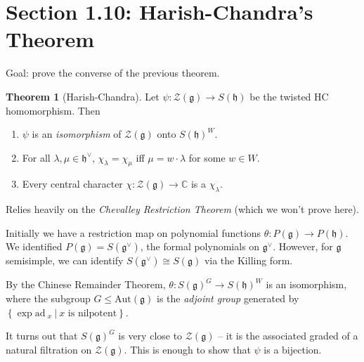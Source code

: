 \documentclass[11pt]{scrartcl}
\theoremstyle{definition}
\theoremstyle{theorem}
\newtheorem{theorem}{Theorem}[section]
\theoremstyle{proof}
\newenvironment{proof}
{\pushQED{$\qed$}\pf}
{\par\popQED\endpf}
\theoremstyle{definition}
\theoremstyle{break}
\theoremstyle{problem}
\newcommand{\CC}[0]{{\mathbb{C}}}
\newcommand{\ad}[0]{\mathrm{ad}~}
\newcommand{\aut}[0]{\mathrm{Aut}}
\newcommand{\dual}[0]{^\vee}
\newcommand{\lieg}[0]{{\mathfrak{g}}}
\newcommand{\lieh}[0]{{\mathfrak{h}}}
\newcommand{\mcz}[0]{{\mathcal{Z}}}
\newcommand{\suchthat}[0]{{~\mathrel{\Big|}~}}
\newcommand{\theset}[1]{\left\{{#1}\right\}}
\renewcommand{\qed}[0]{\hfill\blacksquare}
\renewcommand{\to}[0]{\longrightarrow}
\begin{document}
\hypertarget{section-1.10-harish-chandras-theorem}{%
\section{Section 1.10: Harish-Chandra's
Theorem}\label{section-1.10-harish-chandras-theorem}}

Goal: prove the converse of the previous theorem.

\begin{theorem}[Harish-Chandra]

Let \(\psi: \mcz(\lieg) \to S(\lieh)\) be the twisted HC homomorphism.
Then

\begin{enumerate}
\def\labelenumi{\alph{enumi}.}
\item
  \(\psi\) is an \emph{isomorphism} of \(\mcz(\lieg)\) onto
  \(S(\lieh)^W\).
\item
  For all \(\lambda, \mu \in \lieh\dual\), \(\chi_\lambda = \chi_\mu\)
  iff \(\mu = w\cdot \lambda\) for some \(w\in W\).
\item
  Every central character \(\chi: \mcz(\lieg) \to \CC\) is a
  \(\chi_\lambda\).
\end{enumerate}

\end{theorem}

\begin{proof}[of (a)]

Relies heavily on the \emph{Chevalley Restriction Theorem} (which we
won't prove here).

Initially we have a restriction map on polynomial functions
\(\theta: P(\lieg) \to P(\lieh)\). We identified
\(P(\lieg) = S(\lieg\dual)\), the formal polynomials on \(\lieg\dual\).
However, for \(\lieg\) semisimple, we can identify
\(S(\lieg\dual) \cong S(\lieg)\) via the Killing form.

By the Chinese Remainder Theorem, \(\theta: S(\lieg)^G \to S(\lieh)^W\)
is an isomorphism, where the subgroup \(G \leq \aut(\lieg)\) is the
\emph{adjoint group} generated by
\(\theset{\exp \ad_x \suchthat x \text{ is nilpotent}}\).

It turns out that \(S(\lieg)^G\) is very close to \(\mcz(\lieg)\) -- it
is the associated graded of a natural filtration on \(\mcz(\lieg)\).
This is enough to show that \(\psi\) is a bijection.\end{proof}
\end{document}
